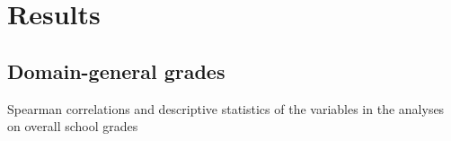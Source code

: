 \documentclass[
  man]{apa6}
\begin{document}
\hypertarget{results}{%
\section{Results}\label{results}}

\hypertarget{domain-general-grades}{%
\subsection{Domain-general grades}\label{domain-general-grades}}

\begin{table}[tbp]

\begin{center}
\begin{threeparttable}

\caption{\label{tab:corr}Spearman correlations and descriptive statistics of the variables in the analyses on overall school grades}

\footnotesize{

}
\end{threeparttable}
\end{center}
\end{table}
\end{document}
